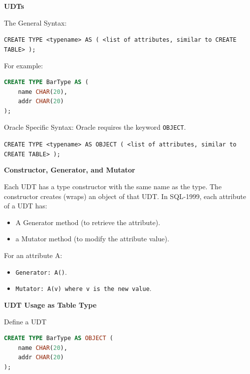 \documentclass[11pt]{article}
\newcommand{\boldsec}[1]{
    \vspace{11pt}
    \textbf{#1}
    \vspace{11pt}
}
\newcommand{\boldsecbottom}[1]{
    \textbf{#1}
    \vspace{11pt}
}
\begin{document}
\boldsec{UDTs}

The General Syntax:

\vspace{11pt}
\texttt{CREATE TYPE <typename> AS ( <list of attributes, similar to CREATE TABLE> );}
\vspace{11pt}

For example:

\vspace{11pt}
\begin{lstlisting}[language=sql, breaklines=true, showstringspaces=false]
CREATE TYPE BarType AS (
    name CHAR(20),
    addr CHAR(20)
);
\end{lstlisting}
\vspace{11pt}

Oracle Specific Syntax: Oracle requires the keyword \texttt{OBJECT}.

\vspace{11pt}
\texttt{CREATE TYPE <typename> AS OBJECT ( <list of attributes, similar to CREATE TABLE> );}
\vspace{11pt}

\boldsecbottom{Constructor, Generator, and Mutator}

Each UDT has a type constructor with the same name as the type. The constructor creates (wraps) an object of that UDT. In SQL-1999, each attribute of a UDT has:
\begin{itemize}
    \item A Generator method (to retrieve the attribute).
    \item a Mutator method (to modify the attribute value).
\end{itemize}
\vspace{11pt}

For an attribute A:
\begin{itemize}
    \item \texttt{Generator: A()}.
    \item \texttt{Mutator: A(v) where v is the new value}.
\end{itemize}
\vspace{11pt}

\boldsecbottom{UDT Usage as Table Type}

Define a UDT

\vspace{11pt}
\begin{lstlisting}[language=sql, breaklines=true, showstringspaces=false]
CREATE TYPE BarType AS OBJECT (
    name CHAR(20),
    addr CHAR(20)
);
\end{lstlisting}
\vspace{11pt}
\end{document}
